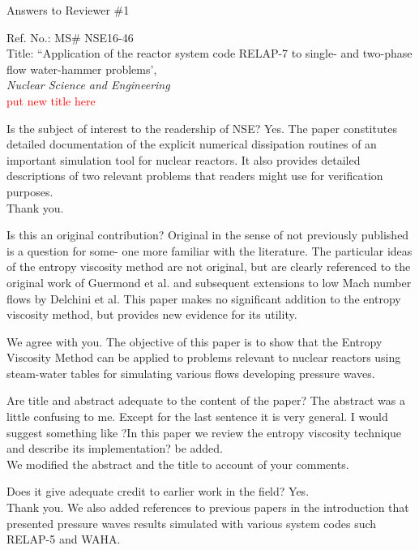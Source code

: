 \documentclass{article}
\newcommand{\tcr}[1]{\textcolor{red}{#1}}
\begin{document}
\begin{center}
{ \Large Answers to Reviewer \#1}
\end{center}

\bigskip

\noindent Ref. No.: MS\# NSE16-46\\
Title: ``Application of the reactor system code RELAP-7 to single- and two-phase flow water-hammer problems', \\
{\it Nuclear Science and Engineering}\\
\tcr{put new title here}

\bigskip
\bigskip

{\color{blue}
Is the subject of interest to the readership of NSE?
Yes. The paper constitutes detailed documentation of the explicit numerical dissipation routines of an important simulation tool for nuclear reactors. It also provides detailed descriptions of two relevant problems that readers might use for verification purposes. \\
}
Thank you.

\bigskip

{\color{blue}
Is this an original contribution?
Original in the sense of not previously published is a question for some- one more familiar with the literature.
The particular ideas of the entropy viscosity method are not original, but are clearly referenced to the original work of Guermond et al. and subsequent extensions to low Mach number flows by Delchini et al. This paper makes no significant addition to the entropy viscosity method, but provides new evidence for its utility. \\
}

We agree with you. The objective of this paper is to show that the Entropy Viscosity Method can be applied to problems relevant to nuclear reactors using steam-water tables for simulating various flows developing pressure waves.

\bigskip

{\color{blue}
Are title and abstract adequate to the content of the paper?
The abstract was a little confusing to me. Except for the last sentence it is very general. I would suggest something like ?In this paper we review the entropy viscosity technique and describe its implementation? be added. \\
}
We modified the abstract and the title to account of your comments. 

\bigskip

{\color{blue}
Does it give adequate credit to earlier work in the field? Yes. \\
}
Thank you. We also added references to previous papers in the introduction that presented pressure waves results simulated with various system codes such RELAP-5 and WAHA.
\bigskip
\end{document}
